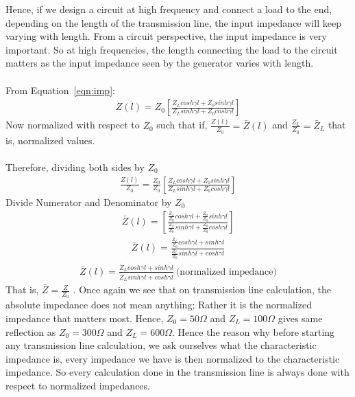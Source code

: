 Hence, if we design a circuit at high frequency and connect a load to the end, depending on the length of the transmission line, the input impedance will keep varying with length. From a circuit perspective, the input impedance is very important. So at high frequencies, the length connecting the load to the circuit matters as the input impedance seen by the generator varies with length.\\\\
From Equation~\ref{eqn:imp}:
\begin{align*}
Z(l) = Z_0\left[\frac{Z_Lcosh\gamma l + Z_0sinh\gamma l}{Z_Lsinh\gamma l + Z_0cosh\gamma l}\right]
\end{align*}
Now normalized with respect to $Z_0$ such that if,
$\frac{Z(l)}{Z_0} = \bar{Z}(l)$ and $\frac{Z_L}{Z_0} =\bar{Z}_L$ that is, normalized values.\\\\
Therefore, dividing both sides by $Z_0$
\begin{align*}
\frac{Z(l)}{Z_0} = \frac{Z_0}{Z_0}[\frac{Z_Lcosh\gamma l + Z_0sinh\gamma l}{Z_Lsinh\gamma l + Z_0cosh\gamma l}] 
\end{align*}
Divide Numerator and Denominator by $Z_0$
\begin{align*}
\bar{Z}(l) =\left [ \frac{\frac{Z_L}{Z_0}cosh\gamma l + \frac{Z_0}{Z_0}sinh\gamma l}{\frac{Z_L}{Z_0}sinh\gamma l + \frac{Z_0}{Z_0}cosh\gamma l}\right]
\end{align*}
\begin{align*}
\bar{Z}(l) = \frac{\frac{Z_L}{Z_0}cosh\gamma l + sinh\gamma l}{\frac{Z_L}{Z_0}sinh\gamma l + cosh\gamma l}
\end{align*}
\begin{align}
\bar{Z}(l) = \frac{\bar{Z}_Lcosh\gamma l + sinh\gamma l}{\bar{Z}_Lsinh\gamma l + cosh\gamma l}\ \text{(normalized impedance)}
\end{align} 
That is, $\bar{Z} = \frac{Z}{Z_0}$ .
Once again we see that on transmission line calculation, the absolute impedance does not mean anything; Rather it is the normalized impedance that matters most. Hence, $Z_0 = 50\Omega$ and $Z_L = 100\Omega$ gives same reflection as $Z_0 = 300\Omega$ and $Z_L =600\Omega$. Hence the reason why before starting any transmission line calculation, we ask ourselves what the characteristic impedance is, every impedance we have is then normalized to the characteristic impedance. So every calculation done in the transmission line is always done with respect to normalized impedances.\\
